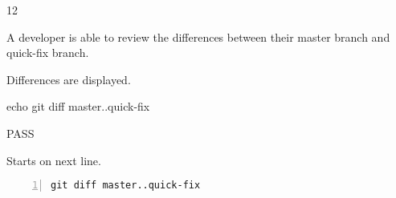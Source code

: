 \begin{description}[align=right,leftmargin=3.2cm,labelindent=3.0cm]
\item[Step:] 12
\item[Confirm:] A developer is able to review the differences between their master branch and quick-fix branch.
\item[Expectation:] Differences are displayed.
\item[Command:] echo git  diff master..quick-fix
\item[Test Result:] PASS
\item[Evidence:] Starts on next line.
\end{description}
\begin{lstlisting}[numbers=left]
git diff master..quick-fix

\end{lstlisting}
